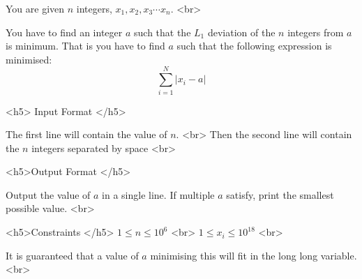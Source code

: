 You are given $n$ integers, $x_1, x_2, x_3 \cdots x_n$. <br>

You have to find an integer $a$ such that the $L_1$ deviation of the $n$ integers from $a$ is minimum.
That is you have to find $a$ such that the following expression is minimised:
$$ \sum_{i=1}^{N} |x_i - a| $$ 

<h5> Input Format </h5>

The first line will contain the value of $n$. <br>
Then the second line will contain the $n$ integers separated by space <br>

<h5>Output Format </h5>

Output the value of $a$ in a single line. If multiple $a$ satisfy, print the smallest possible value. <br>

<h5>Constraints </h5>
$1 \leq n \leq 10^6$ <br>
$1 \leq x_i \leq 10^{18}$ <br>

It is guaranteed that a value of $a$ minimising this will fit in the long long variable. <br>